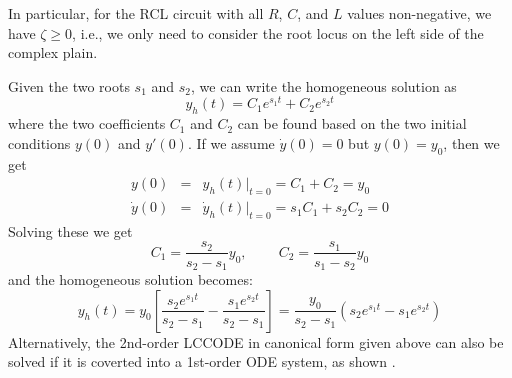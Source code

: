 \documentclass{article}
\begin{document}
In particular, for the RCL circuit with all $R$, $C$, and $L$ values 
non-negative, we have $\zeta\ge 0$, i.e., we only need to consider the 
root locus on the left side of the complex plain.

Given the two roots $s_1$ and $s_2$, we can write the homogeneous 
solution as
\begin{equation}
  y_h(t)=C_1 e^{s_1t}+C_2 e^{s_2t} 
\end{equation}
where the two coefficients $C_1$ and $C_2$ can be found based on the 
two initial conditions $y(0)$ and $y'(0)$. If we assume $\dot{y}(0)=0$ 
but $y(0)=y_0$, then we get
\begin{eqnarray}
  y(0)&=&y_h(t)\bigg|_{t=0}=C_1+C_2=y_0  
  \nonumber \\
  \dot{y}(0)&=&\dot{y}_h(t)\bigg|_{t=0}=s_1C_1+s_2C_2=0 
\end{eqnarray}
Solving these we get
\begin{equation}
  C_1=\frac{s_2}{s_2-s_1} y_0,\;\;\;\;\;\;\;\;C_2=\frac{s_1}{s_1-s_2} y_0 
\end{equation}
and the homogeneous solution becomes:
\begin{equation}
  y_h(t)=y_0 \left[ \frac{s_2 e^{s_1t}}{s_2-s_1}-\frac{s_1 e^{s_2t}}{s_2-s_1} \right]
  =\frac{y_0}{s_2-s_1} (s_2 e^{s_1t}-s_1 e^{s_2t})
\end{equation}
Alternatively, the 2nd-order LCCODE in canonical form given above can 
also be solved if it is coverted into a 1st-order ODE system, as
shown .
\end{document}
